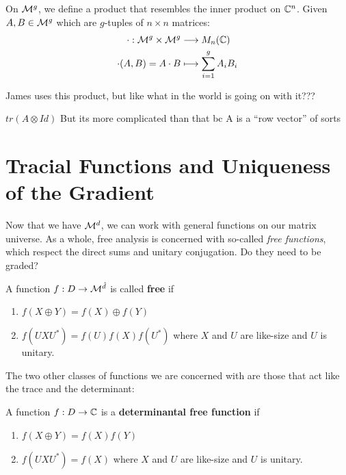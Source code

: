 On \(\mathcal{M}^{g} \), we define a product that resembles the inner product on
\(\mathbb{C}^n\). Given \(A,B \in \mathcal{M}^{g} \) which are \(g\)-tuples of \(n \times n\)
matrices:
\begin{align*}
	\cdot : \mathcal{M}^{g} \times \mathcal{M}^{g}  &\longrightarrow M_n(\mathbb{C}) \\
  \cdot (A,B) = A \cdot B &\longmapsto \sum_{i=1}^g A_i B_i
\end{align*}

{\color{red} James uses this product, but like what in the world is going on
  with it???}

{\color{red} \(tr (A \otimes Id)\) But its more complicated than that bc A is a
``row vector'' of sorts}


\section{Tracial Functions and Uniqueness of the Gradient}%
\label{sec:TracGrad}
Now that we have \(\mathcal{M}^d\), we can work with general functions on our matrix
universe. As a whole, free analysis is concerned with so-called \emph{free
  functions}, which respect the direct sums and unitary conjugation.
{\color{red} Do they need to be graded?}
\begin{definition}
\label{def:FreeFun}
  A function \(f: D\to \mathcal{M}^{\hat{d}}\) is called \textbf{free} if
  \begin{enumerate}
    \item \(f(X\oplus Y)= f(X) \oplus f(Y)\)
    \item \(f(U X U^*) = f(U)f(X)f(U^*)\) where \(X\) and \(U\) are like-size
          and \(U\) is unitary.
  \end{enumerate}
\end{definition}

The two other classes of functions we are concerned with are those that act like
the trace and the determinant:
\begin{definition}
  \label{def:DetFreeFun}
  A function \(f: D \to \mathbb{C} \) is a \textbf{determinantal free function} if
  \begin{enumerate}
    \item \(f(X\oplus Y) = f(X)f(Y)\)
    \item \(f(U X U^*) = f(X)\) where \(X\) and \(U\) are like-size
          and \(U\) is unitary.
  \end{enumerate}
\end{definition}

